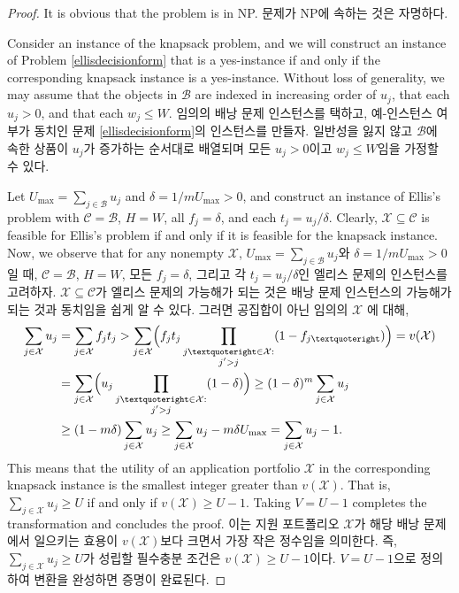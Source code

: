 \documentclass[11pt]{article} %
\theoremstyle{definition}
\theoremstyle{definition}
\begin{document}
\begin{proof}
\ifen It is obvious that the problem is in NP.
\else 문제가 NP에 속하는 것은 자명하다.\fi

\ifen
Consider an instance of the knapsack problem, and we will construct an instance of Problem \ref{ellisdecisionform} that is a yes-instance if and only if the corresponding knapsack instance is a yes-instance. Without loss of generality, we may assume that the objects in $\mathcal{B}$ are indexed in increasing order of $u_j$, that each $u_j >0$, and that each $w_j \leq W$. 
\else
임의의 배낭 문제 인스턴스를 택하고, 예-인스턴스 여부가 동치인 문제 \ref{ellisdecisionform}의 인스턴스를 만들자. 일반성을 잃지 않고 $\mathcal{B}$에 속한 상품이 $u_j$가 증가하는 순서대로 배열되며 모든 $u_j >0$이고 $w_j \leq W$임을 가정할 수 있다.
\fi

\ifen
Let $U_{\mathrm{max}} = \sum_{j \in \mathcal{B}} u_j$ and $\delta = {1} /{m U_{\mathrm{max}}} > 0$, and construct an instance of Ellis’s problem with $\mathcal{C} = \mathcal{B}$, $H = W$, all $f_j = \delta$, and each $t_j = u_j / \delta$. Clearly, $\mathcal{X} \subseteq \mathcal{C}$ is feasible for Ellis’s problem if and only if it is feasible for the knapsack instance. Now, we observe that for any nonempty $\mathcal{X}$,
\else
$U_{\mathrm{max}} = \sum_{j \in \mathcal{B}} u_j$와 $\delta = {1} /{m U_{\mathrm{max}}} > 0$일 때, $\mathcal{C} = \mathcal{B}$, $H = W$,  모든 $f_j = \delta$, 그리고 각 $t_j = u_j / \delta$인 엘리스 문제의 인스턴스를 고려하자. $\mathcal{X} \subseteq \mathcal{C}$가 엘리스 문제의 가능해가 되는 것은 배낭 문제 인스턴스의 가능해가 되는 것과 동치임을 쉽게 알 수 있다. 그러면 공집합이 아닌 임의의 $\mathcal{X}$ 에 대해,
\fi
\begin{align}
\begin{split}
\sum_{j \in \mathcal{X}} u_j &=  \sum_{j \in \mathcal{X}} f_j t_j
> \sum_{j \in \mathcal{X}} \Bigl( f_j t_j \prod_{\substack{j’ \in \mathcal{X}: \\ j' > j}} (1 - f_{j’}) \Bigr)
= v(\mathcal{X}) \\
&= \sum_{j \in \mathcal{X}} \Bigl( u_j  \prod_{\substack{j’ \in \mathcal{X}: \\ j' > j}} (1 - \delta) \Bigr)
\geq (1 - \delta)^m \sum_{j \in \mathcal{X}} u_j \\
&\geq (1 - m\delta) \sum_{j \in \mathcal{X}} u_j 
\geq \sum_{j \in \mathcal{X}} u_j  - m\delta U_{\mathrm{max}}
= \sum_{j \in \mathcal{X}} u_j  - 1.
\end{split}
\end{align}
\ifen
This means that the utility of an application portfolio $\mathcal{X}$ in the corresponding knapsack instance is the smallest integer greater than $v( \mathcal{X})$. That is, $\sum_{j \in \mathcal{X}} u_j \geq U$ if and only if $v(\mathcal{X}) \geq U -1$. Taking $V = U-1$ completes the transformation and concludes the proof. 
\else
이는 지원 포트폴리오 $\mathcal{X}$가 해당 배낭 문제에서 일으키는 효용이 $v( \mathcal{X})$보다 크면서 가장 작은 정수임을 의미한다. 즉, $\sum_{j \in \mathcal{X}} u_j \geq U$가 성립할 필수충분 조건은 $v(\mathcal{X}) \geq U -1$이다. $V = U-1$으로 정의하여 변환을 완성하면 증명이 완료된다.
\fi
\end{proof}
\end{document}
